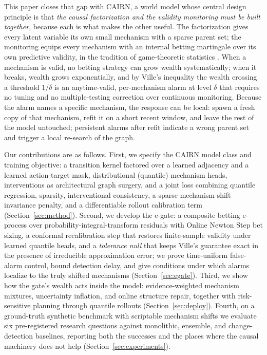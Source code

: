 \documentclass[preprint,12pt]{elsarticle}
\theoremstyle{definition}
\theoremstyle{remark}
\begin{document}
This paper closes that gap with CAIRN, a world model whose central design
principle is that \emph{the causal factorization and the validity
monitoring must be built together}, because each is what makes the other
useful. The factorization gives every latent variable its own small
mechanism with a sparse parent set; the monitoring equips every mechanism
with an internal betting martingale over its own predictive validity, in
the tradition of game-theoretic statistics
\citep{shafer2019game,ramdas2023game,waudbysmith2024estimating}. When a
mechanism is valid, no betting strategy can grow wealth systematically;
when it breaks, wealth grows exponentially, and by Ville's inequality
\citep{ville1939etude} the wealth crossing a threshold $1/\delta$ is an
anytime-valid, per-mechanism alarm at level $\delta$ that requires no
tuning and no multiple-testing correction over continuous monitoring.
Because the alarm names a specific mechanism, the response can be local:
spawn a fresh copy of that mechanism, refit it on a short recent window,
and leave the rest of the model untouched; persistent alarms after refit
indicate a wrong parent set and trigger a local re-search of the graph.

Our contributions are as follows. First, we specify the CAIRN model class
and training objective: a transition kernel factored over a learned
adjacency and a learned action-target mask, distributional (quantile)
mechanism heads, interventions as architectural graph surgery, and a joint
loss combining quantile regression, sparsity, interventional consistency,
a sparse-mechanism-shift invariance penalty, and a differentiable rollout
calibration term (Section~\ref{sec:method}). Second, we develop the
e-gate: a composite betting e-process over probability-integral-transform
residuals with Online Newton Step bet sizing, a conformal recalibration
step that restores finite-sample validity under learned quantile heads,
and a \emph{tolerance null} that keeps Ville's guarantee exact in the
presence of irreducible approximation error; we prove time-uniform
false-alarm control, bound detection delay, and give conditions under
which alarms localize to the truly shifted mechanisms
(Section~\ref{sec:egate}). Third, we show how the gate's wealth acts
inside the model: evidence-weighted mechanism mixtures, uncertainty
inflation, and online structure repair, together with risk-sensitive
planning through quantile rollouts (Section~\ref{sec:deploy}). Fourth, on
a ground-truth synthetic benchmark with scriptable mechanism shifts we
evaluate six pre-registered research questions against monolithic,
ensemble, and change-detection baselines, reporting both the successes
and the places where the causal machinery does not help
(Section~\ref{sec:experiments}).
\end{document}
